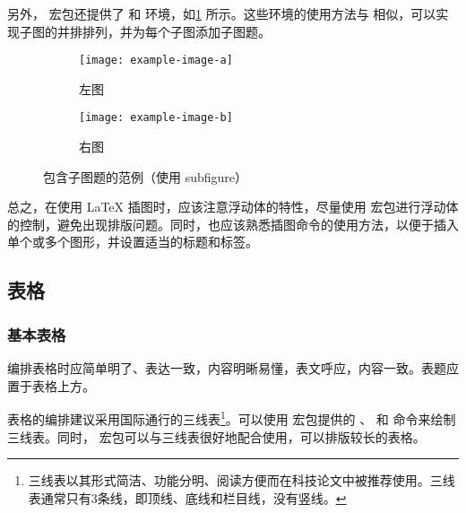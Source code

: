 另外， 宏包还提供了  和  环境，如\cref{fig:subfigure} 所示。这些环境的使用方法与  相似，可以实现子图的并排排列，并为每个子图添加子图题。

\begin{figure}[!htp]
  \centering
  \begin{subfigure}{0.3\textwidth}
    \centering
    \texttt{[image: example-image-a]}
    \caption{左图}
  \end{subfigure}
  \hspace{1cm}
  \begin{subfigure}{0.4\textwidth}
    \centering
    \texttt{[image: example-image-b]}
    \caption{右图}
  \end{subfigure}
  \caption{包含子图题的范例（使用 subfigure）}
  \label{fig:subfigure}
\end{figure}



总之，在使用 \LaTeX{} 插图时，应该注意浮动体的特性，尽量使用  宏包进行浮动体的控制，避免出现排版问题。同时，也应该熟悉插图命令的使用方法，以便于插入单个或多个图形，并设置适当的标题和标签。


\subsection{表格}

\subsubsection{基本表格}

编排表格时应简单明了、表达一致，内容明晰易懂，表文呼应，内容一致。表题应置于表格上方。

表格的编排建议采用国际通行的三线表\footnote{三线表以其形式简洁、功能分明、阅读方便而在科技论文中被推荐使用。三线表通常只有3条线，即顶线、底线和栏目线，没有竖线。}。可以使用  宏包提供的 、 和  命令来绘制三线表。同时， 宏包可以与三线表很好地配合使用，可以排版较长的表格。

